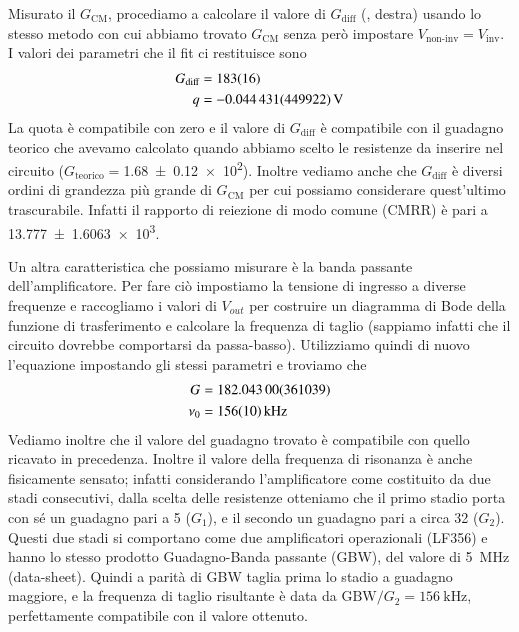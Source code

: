 \documentclass[
    rmp,
    reprint, 
    superscriptaddress, 
    altaffilletter, 
    amsmath, 
    amssymb,
    a4paper]{revtex4-2}
\begin{document}
Misurato il $G_{\text{CM}}$, procediamo a calcolare il valore di $G_{\text{diff}}$ (, destra) usando lo stesso metodo con cui abbiamo trovato $G_{\text{CM}}$ senza però impostare $V_{\text{non-inv}}=V_{\text{inv}}$. I valori dei parametri che il fit ci restituisce sono
\begin{align*}
    G_{\text{diff}} &=\num[round-mode=none]{183+-16} \\
    q &=\SI{-0.044431+-0.449922}{\volt} \\
\end{align*}
La quota è compatibile con zero e il valore di $G_{\text{diff}}$ è compatibile con il guadagno teorico che avevamo calcolato quando abbiamo scelto le resistenze da inserire nel circuito ($G_{\text{teorico}}=$\num{1.68 +- 0.12e2}). Inoltre vediamo anche che $G_{\text{diff}}$ è diversi ordini di grandezza più grande di $G_{\text{CM}}$ per cui possiamo considerare quest'ultimo trascurabile. Infatti il rapporto di reiezione di modo comune (CMRR) è pari a \num{13.777+-1.6063e3}.

Un altra caratteristica che possiamo misurare è la banda passante dell'amplificatore. Per fare ciò impostiamo la tensione di ingresso a diverse frequenze e raccogliamo i valori di $V_{out}$ per costruire un diagramma di Bode della funzione di trasferimento e calcolare la frequenza di taglio (sappiamo infatti che il circuito dovrebbe comportarsi da passa-basso). Utilizziamo quindi di nuovo l'equazione  impostando gli stessi parametri e troviamo che 
\begin{align*}
    G     &=\num{ 182.043 +-  3.61039} \\
    \nu_0 &=\SI[round-mode=none]{ 156 +-  10}{\kilo\hertz} \\ 
\end{align*}
Vediamo inoltre che il valore del guadagno trovato è compatibile con quello ricavato in precedenza. 
Inoltre il valore della frequenza di risonanza è anche fisicamente sensato; infatti considerando l'amplificatore come costituito da due stadi consecutivi, dalla scelta delle resistenze otteniamo che il primo stadio porta con sé un guadagno pari a 5 ($G_{1}$), e il secondo un guadagno pari a circa 32 ($G_{2}$). Questi due stadi si comportano come due amplificatori operazionali (LF356) e hanno lo stesso prodotto Guadagno-Banda passante (GBW), del valore di \SI{5}{\mega\hertz} (data-sheet). Quindi a parità di GBW taglia prima lo stadio a guadagno maggiore, e la frequenza di taglio risultante è data da $\text{GBW}/G_{2} = \SI{156}{\kilo\hertz}$, perfettamente compatibile con il valore ottenuto.
\end{document}
